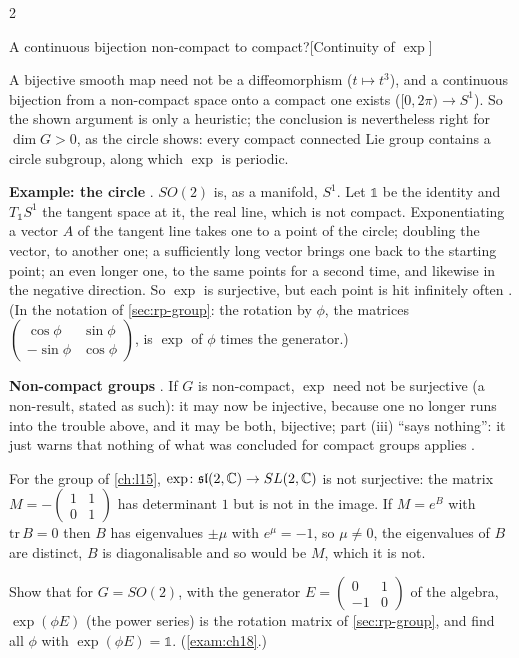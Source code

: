 \begin{paracol}{2}
\begin{answer}{A continuous bijection non-compact to compact?}[Continuity of $\exp$]
\end{answer}
\begin{coursenote}
A bijective smooth map need not be a diffeomorphism ($t\mapsto t^3$), and a continuous bijection from a non-compact space onto a compact one exists ($[0,2\pi)\to S^1$). So the shown argument is only a heuristic; the conclusion is nevertheless right for $\dim G>0$, as the circle shows: every compact connected Lie group contains a circle subgroup, along which $\exp$ is periodic. 
\end{coursenote}
\textbf{Example: the circle} . $SO(2)$ is, as a manifold, $S^1$. Let $\mathbb 1$ be the identity and $T_{\mathbb 1}S^1$ the tangent space at it, the real line, which is not compact. Exponentiating a vector $A$ of the tangent line takes one to a point of the circle; doubling the vector, to another one; a sufficiently long vector brings one back to the starting point; an even longer one, to the same points for a second time, and likewise in the negative direction. So $\exp$ is surjective, but each point is hit infinitely often   . (In the notation of \cref{sec:rp-group}: the rotation by $\phi$, the matrices $\begin{pmatrix}\cos\phi&\sin\phi\\-\sin\phi&\cos\phi\end{pmatrix}$, is $\exp$ of $\phi$ times the generator.)

\textbf{Non-compact groups} . If $G$ is non-compact, $\exp$ need not be surjective (a non-result, stated as such): it may now be injective, because one no longer runs into the trouble above, and it may be both, bijective; part (iii) ``says nothing'': it just warns that nothing of what was concluded for compact groups applies  .
\begin{coursenote}
For the group of \cref{ch:l15}, $\exp\colon\mathfrak{sl}(2,\mathbb{C})\to SL(2,\mathbb{C})$ is not surjective: the matrix $M=-\begin{pmatrix}1&1\\0&1\end{pmatrix}$ has determinant $1$ but is not in the image. If $M=e^{B}$ with $\mathrm{tr}\,B=0$ then $B$ has eigenvalues $\pm\mu$ with $e^{\mu}=-1$, so $\mu\ne0$, the eigenvalues of $B$ are distinct, $B$ is diagonalisable and so would be $M$, which it is not. 
\end{coursenote}
\begin{exercise}\label{ex:rc-s1}
Show that for $G=SO(2)$, with the generator $E=\begin{pmatrix}0&1\\-1&0\end{pmatrix}$ of the algebra, $\exp(\phi E)$ (the power series) is the rotation matrix of \cref{sec:rp-group}, and find all $\phi$ with $\exp(\phi E)=\mathbb 1$. (\cref{exam:ch18}.)
\end{exercise}


\end{paracol}
